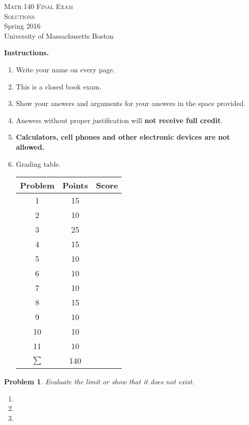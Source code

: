 \documentclass[12pt]{article}
\newtheorem{problem}{Problem}
\renewcommand{\fcProblemRef}{\theproblem.\theenumi}
\begin{document}
\begin{center}
\Huge 
\Huge
\textsc{Math 140 Final Exam}\\
\textsc{Solutions}\\
\Large Spring 2016\\
University of Massachusetts Boston
\end{center}
\textbf{Instructions.}
\begin{enumerate}
\item Write your name on every page.
\item This is a closed book exam.
\item Show your answers and arguments for your answers in the space provided.
\item Answers without proper justification will \textbf{not receive full credit}.
\item \textbf{Calculators, cell phones and other electronic devices are not allowed.}
\item Grading table. 

{\Large
\begin{tabular}{|c|c|c|}\hline
Problem & Points & Score\\\hline\hline
1& 15 &\\\hline
2& 10 &\\\hline
3& 25 &\\\hline
4& 15 &\\\hline
5& 10 &\\\hline
6& 10 &\\\hline
7& 10 &\\\hline
8&  15 &\\\hline
9&  10 &\\\hline
10& 10 &\\\hline
11& 10 &\\\hline
$\sum$ & 140 &\\\hline
\end{tabular}
}
\end{enumerate}
\begin{problem}
Evaluate the limit or show that it does not exist.
\begin{enumerate}[ref={\fcProblemRef}]
\item 

\item 
\item 
\end{enumerate}





\end{problem}
\end{document}
